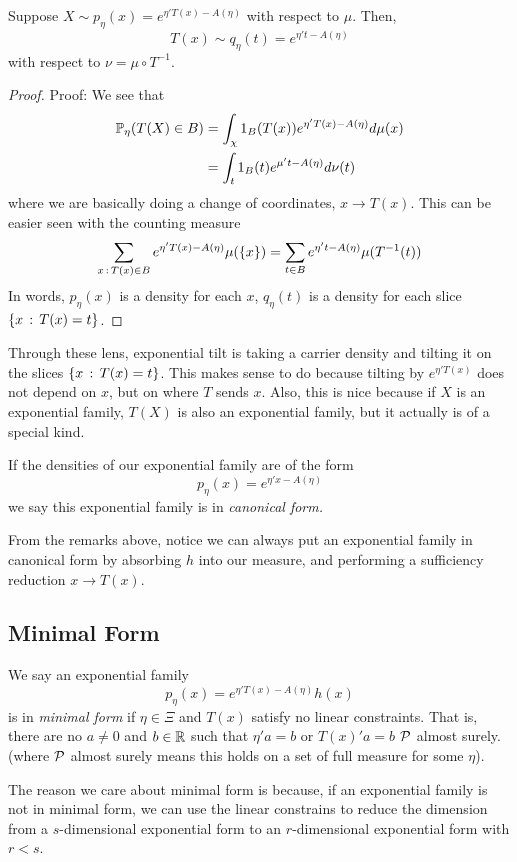 \begin{lemma}
    Suppose $X \sim p_{\eta}(x) = e^{\eta'T(x) - A(\eta)}$ with respect to $\mu$. Then, 
    \[ T(x) \sim q_{\eta}(t) = e^{\eta't - A(\eta)} \]
    with respect to $\nu = \mu \circ T^{-1}$. 
\end{lemma}
\begin{proof}{Proof:}
    We see that
    \begin{align*}
        \bb{P}_{\eta}(T(X) \in B) &= \int_{\chi} 1_{B}(T(x))e^{\eta'T(x) - A(\eta)}d\mu(x)\\
        &= \int_{t} 1_{B}(t)e^{\mu't - A(\eta)}d\nu(t)
    \end{align*}
    where we are basically doing a change of coordinates, $x \to T(x)$. This can be easier seen with the counting measure
    \[ \sum_{x \col T(x) \in B} e^{\eta'T(x) - A(\eta)}\mu(\{x\}) = \sum_{t \in B} e^{\eta't - A(\eta)}\mu(T^{-1}(t)) \]
    In words, $p_{\eta}(x)$ is a density for each $x$, $q_{\eta}(t)$ is a density for each slice $\{x \col T(x) = t\}$. 
\end{proof}

Through these lens, exponential tilt is taking a carrier density and tilting it on the slices $\{x \col T(x) = t\}$. This makes sense to do because tilting by $e^{\eta'T(x)}$ does not depend on $x$, but on where $T$ sends $x$. Also, this is nice because if $X$ is an exponential family, $T(X)$ is also an exponential family, but it actually is of a special kind.

\begin{definition}
    If the densities of our exponential family are of the form
    \[ p_{\eta}(x) = e^{\eta'x - A(\eta)} \]
    we say this exponential family is in \emph{canonical form.} 
\end{definition}

From the remarks above, notice we can always put an exponential family in canonical form by absorbing $h$ into our measure, and performing a sufficiency reduction $x \to T(x)$.\\

\subsection*{Minimal Form}
\sectionspace

\begin{definition}
    We say an exponential family
    \[ p_{\eta}(x) = e^{\eta'T(x) - A(\eta)}h(x) \]
    is in \emph{minimal form} if $\eta \in \Xi$ and $T(x)$ satisfy no linear constraints. That is, there are no $a \ne 0$ and $b \in \R$ such that $\eta'a = b$ or $T(x)'a = b$ $\cal{P}$ almost surely. (where $\cal{P}$ almost surely means this holds on a set of full measure for some $\eta$). 
\end{definition}
The reason we care about minimal form is because, if an exponential family is not in minimal form, we can use the linear constrains to reduce the dimension from a $s$-dimensional exponential form to an $r$-dimensional exponential form with $r < s$. 

